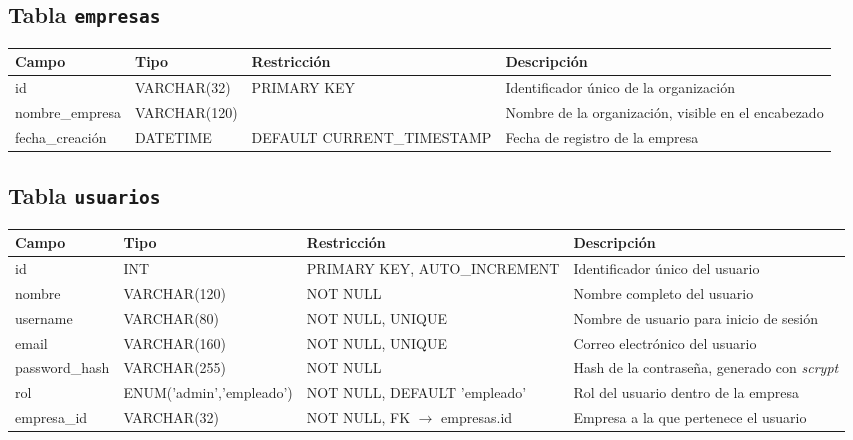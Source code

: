 \subsection*{Tabla \texttt{empresas}}
\begin{table}[H]
\centering
\renewcommand{\arraystretch}{1.3}
\begin{tabularx}{\textwidth}{|>{\raggedright\arraybackslash}p{3.0cm}|l|>{\raggedright\arraybackslash}p{3.2cm}|X|}
\hline
\textbf{Campo} & \textbf{Tipo} & \textbf{Restricción} & \textbf{Descripción} \\
\hline
id & VARCHAR(32) & PRIMARY KEY & Identificador único de la organización \\
\hline
nombre\_\discretionary{}{}{}empresa & VARCHAR(120) & & Nombre de la organización, visible en el encabezado \\
\hline
fecha\_\discretionary{}{}{}creación & DATETIME & DEFAULT CURRENT\_\discretionary{}{}{}TIMESTAMP & Fecha de registro de la empresa \\
\hline
\end{tabularx}
\end{table}

\subsection*{Tabla \texttt{usuarios}}
\begin{table}[H]
\centering
\renewcommand{\arraystretch}{1.3}
\begin{tabularx}{\textwidth}{|>{\raggedright\arraybackslash}p{3.0cm}|l|>{\raggedright\arraybackslash}p{3.2cm}|X|}
\hline
\textbf{Campo} & \textbf{Tipo} & \textbf{Restricción} & \textbf{Descripción} \\
\hline
id & INT & PRIMARY KEY, AUTO\_\discretionary{}{}{}INCREMENT & Identificador único del usuario \\
\hline
nombre & VARCHAR(120) & NOT NULL & Nombre completo del usuario \\
\hline
username & VARCHAR(80) & NOT NULL, UNIQUE & Nombre de usuario para inicio de sesión \\
\hline
email & VARCHAR(160) & NOT NULL, UNIQUE & Correo electrónico del usuario \\
\hline
password\_\discretionary{}{}{}hash & VARCHAR(255) & NOT NULL & Hash de la contraseña, generado con \textit{scrypt} \\
\hline
rol & ENUM('admin','empleado') & NOT NULL, DEFAULT 'empleado' & Rol del usuario dentro de la empresa \\
\hline
empresa\_\discretionary{}{}{}id & VARCHAR(32) & NOT NULL, FK $\to$ empresas.id & Empresa a la que pertenece el usuario \\
\hline
\end{tabularx}
\end{table}

